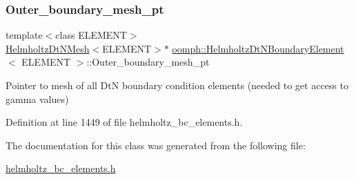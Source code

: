 \subsubsection{\texorpdfstring{Outer\+\_\+boundary\+\_\+mesh\+\_\+pt}{Outer\_boundary\_mesh\_pt}}
{\footnotesize\ttfamily template$<$class E\+L\+E\+M\+E\+NT$>$ \\
\hyperlink{classoomph_1_1HelmholtzDtNMesh}{Helmholtz\+Dt\+N\+Mesh}$<$E\+L\+E\+M\+E\+NT$>$$\ast$ \hyperlink{classoomph_1_1HelmholtzDtNBoundaryElement}{oomph\+::\+Helmholtz\+Dt\+N\+Boundary\+Element}$<$ E\+L\+E\+M\+E\+NT $>$\+::Outer\+\_\+boundary\+\_\+mesh\+\_\+pt\hspace{0.3cm}{\ttfamily [private]}}



Pointer to mesh of all DtN boundary condition elements (needed to get access to gamma values) 



Definition at line 1449 of file helmholtz\+\_\+bc\+\_\+elements.\+h.



The documentation for this class was generated from the following file\+:\begin{DoxyCompactItemize}
\item 
\hyperlink{helmholtz__bc__elements_8h}{helmholtz\+\_\+bc\+\_\+elements.\+h}\end{DoxyCompactItemize}
